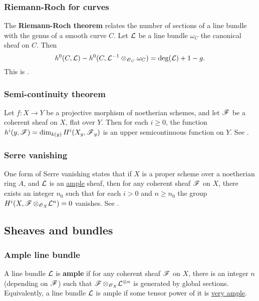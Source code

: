 \documentclass[11pt, english]{article}
\begin{document}
\subsubsection{Riemann-Roch for curves}
\label{riemannroch}

The \textbf{Riemann-Roch theorem} relates the number of sections of a line bundle with the genus of a smooth curve $C$. Let $\mathcal{L}$ be a line bundle $\omega_C$ the canonical sheaf on $C$. Then
\[
h^0(C,\mathcal{L}) - h^0(C, \mathcal{L}^{-1} \otimes_{\operatorname{\mathscr{O}}_{C}} \omega_C) = \deg(\mathcal{L}) +1 -g.
\]
This is \cite[Theorem IV.1.3]{hartshorne}.

\subsubsection{Semi-continuity theorem}
\label{semicontinuity}

Let $f:X \to Y$ be a projective morphism of noetherian schemes, and let $\operatorname{\mathscr{F}}$ be a coherent sheaf on $X$, flat over $Y$. Then for each $i \geq 0$, the function $h^i(y,\operatorname{\mathscr{F}})=\dim_{k(y)} H^i(X_y,\operatorname{\mathscr{F}}_y)$ is an upper semicontinuous function on $Y$. See \cite[Chapter III, Theorem 12.8]{hartshorne}.

\subsubsection{Serre vanishing}
\label{serrevanishing}

One form of Serre vanishing states that if $X$ is a proper scheme over a noetherian ring $A$, and $\mathcal{L}$ is an \hyperref[amplelinebundle]{ample} sheaf, then for any coherent sheaf $\operatorname{\mathscr{F}}$ on $X$, there exists an integer $n_0$ such that for each $i > 0$ and $n \geq n_0$ the group $H^i(X, \operatorname{\mathscr{F}} \otimes_{\operatorname{\mathscr{O}}_X} \mathcal{L}^n)=0$ vanishes. See \cite[Proposition III.5.3]{hartshorne}.

\subsection{Sheaves and bundles}
\subsubsection{Ample line bundle}
\label{amplelinebundle}
A line bundle $\mathcal{L}$ is \textbf{ample} if for any coherent sheaf $\operatorname{\mathscr{F}}$ on $X$, there is an integer $n$ (depending on $\operatorname{\mathscr{F}}$) such that $\operatorname{\mathscr{F}} \otimes_{\operatorname{\mathscr{O}}_X} \mathcal{L}^{\otimes n}$ is generated by global sections. Equivalently, a line bundle $\mathcal{L}$ is ample if some tensor power of it is \hyperref[veryample]{very ample}.
\end{document}

